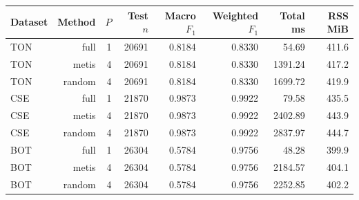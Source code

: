 \begin{tabular}{lrrrrrrr}
\toprule
Dataset & Method & $P$ & Test $n$ & Macro $F_1$ & Weighted $F_1$ & Total ms & RSS MiB \\
\midrule
TON & full & 1 & 20691 & 0.8184 & 0.8330 & 54.69 & 411.6 \\
TON & metis & 4 & 20691 & 0.8184 & 0.8330 & 1391.24 & 417.2 \\
TON & random & 4 & 20691 & 0.8184 & 0.8330 & 1699.72 & 419.9 \\
CSE & full & 1 & 21870 & 0.9873 & 0.9922 & 79.58 & 435.5 \\
CSE & metis & 4 & 21870 & 0.9873 & 0.9922 & 2402.89 & 443.9 \\
CSE & random & 4 & 21870 & 0.9873 & 0.9922 & 2837.97 & 444.7 \\
BOT & full & 1 & 26304 & 0.5784 & 0.9756 & 48.28 & 399.9 \\
BOT & metis & 4 & 26304 & 0.5784 & 0.9756 & 2184.57 & 404.1 \\
BOT & random & 4 & 26304 & 0.5784 & 0.9756 & 2252.85 & 402.2 \\
\bottomrule
\end{tabular}

